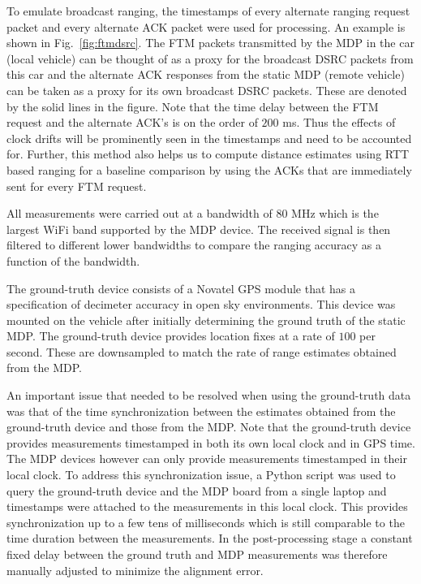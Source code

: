 \documentclass[12pt,journal,final,onecolumn]{IEEEtran}
\theoremstyle{definition}
\theoremstyle{myremark}
\begin{document}
To emulate broadcast ranging, the timestamps of every alternate ranging request
packet and every alternate ACK packet were used for processing. An example is
shown in Fig.~\ref{fig:ftmdsrc}. The FTM packets transmitted by the MDP in the
car (local vehicle) can be thought of as a proxy for the broadcast DSRC packets
from this car and the alternate ACK responses from the static MDP (remote
vehicle) can be taken as a proxy for its own broadcast DSRC packets. These are
denoted by the solid lines in the figure. Note that the time delay between the
FTM request and the alternate ACK's is on the order of $200$ ms. Thus the
effects of clock drifts will be prominently seen in the timestamps and need to
be accounted for.  Further, this method also helps us to compute distance
estimates using RTT based ranging for a baseline comparison by using the ACKs
that are immediately sent for every FTM request. 

All measurements were carried out at a bandwidth of $80$ MHz which is the
largest WiFi band supported by the MDP device. The received signal is then
filtered to different lower bandwidths to compare the ranging accuracy as a
function of the bandwidth.

The ground-truth device consists of a Novatel GPS module that has a
specification of decimeter accuracy in open sky environments. This device was
mounted on the vehicle after initially determining the ground truth of the
static MDP. The ground-truth device provides location fixes at a rate of $100$
per second. These are downsampled to match the rate of range estimates obtained
from the MDP. 

An important issue that needed to be resolved when using the ground-truth data
was that of the time synchronization between the estimates obtained from the
ground-truth device and those from the MDP. Note that the ground-truth device
provides measurements timestamped in both its own local clock and in GPS time.
The MDP devices however can only provide measurements timestamped in their local
clock. To address this synchronization issue, a Python script was used to query
the ground-truth device and the MDP board from a single laptop and timestamps
were attached to the measurements in this local clock. This provides
synchronization up to a few tens of milliseconds which is still comparable to
the time duration between the measurements. In the post-processing stage a
constant fixed delay between the ground truth and MDP measurements was therefore
manually adjusted to minimize the alignment error. 
\end{document}
